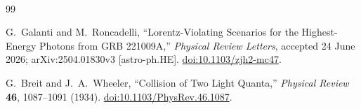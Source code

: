 \
\begin{thebibliography}{99}

G.~Galanti and M.~Roncadelli,
``Lorentz-Violating Scenarios for the Highest-Energy Photons from GRB 221009A,''
\textit{Physical Review Letters}, accepted 24 June 2026;
arXiv:2504.01830v3 [astro-ph.HE].
\href{https://doi.org/10.1103/zjh2-mc47}{doi:10.1103/zjh2-mc47}.

G.~Breit and J.~A.~Wheeler,
``Collision of Two Light Quanta,''
\textit{Physical Review} \textbf{46}, 1087--1091 (1934).
\href{https://doi.org/10.1103/PhysRev.46.1087}{doi:10.1103/PhysRev.46.1087}.

\end{thebibliography}
